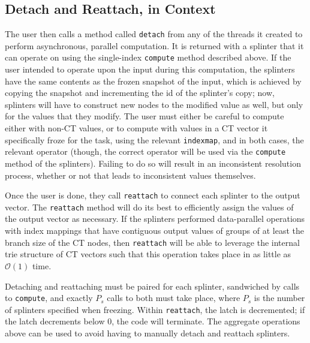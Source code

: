 \subsection{Detach and Reattach, in Context}
The user then calls a method called \texttt{detach} from any of the threads it created 
to perform asynchronous, parallel computation. It is returned with a splinter that it 
can operate on using the single-index \texttt{compute} method described above. If the 
user intended to operate upon the input during this computation, the  
splinters have the same contents as the frozen snapshot of the input, which is achieved 
by copying the snapshot and incrementing the id of the splinter's copy; now, splinters 
will have to construct new nodes to the modified value as well, but only for the values 
that they modify. The user 
must either be careful to compute either with non-CT values, or to compute with values 
in a CT vector it specifically froze for the task, using the relevant \texttt{indexmap}, and in 
both cases, the relevant operator (though, the correct operator will be used via the
\texttt{compute} method of the splinters). Failing to do so will result in an inconsistent 
resolution process, whether or not that leads to inconsistent values themselves.

Once the user is done, they call \texttt{reattach} to connect each splinter to the output 
vector. The \texttt{reattach} method will do its best to efficiently assign the values 
of the output vector as necessary. If the splinters performed data-parallel operations 
with index mappings that have contiguous output values of groups of at least the branch size 
of the CT nodes, then \texttt{reattach} will be able to leverage the internal trie 
structure of CT vectors such that this operation takes place in as little as $\mathcal{O}(1)$
time.

Detaching and reattaching must be paired for each splinter, sandwiched by calls to
\texttt{compute}, and exactly $P_s$ calls to both must take 
place, where $P_s$ is the number of splinters specified when freezing. Within 
\texttt{reattach}, the latch is decremented; if the latch decrements below 0, the code 
will terminate. The aggregate operations above can be used to avoid having to
manually detach and reattach splinters.

